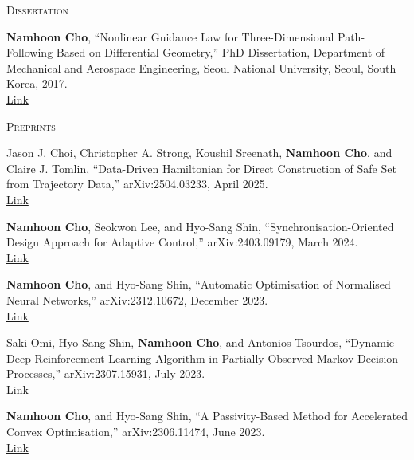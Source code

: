 \textsc{Dissertation}
\vspace{0.5em}
\begin{enumerate}[label={[}\arabic*{]}]
\item \textbf{Namhoon Cho}, ``Nonlinear Guidance Law for Three-Dimensional Path-Following Based on Differential Geometry,'' PhD Dissertation, Department of Mechanical and Aerospace Engineering, Seoul National University, Seoul, South Korea, 2017. \\
\href{https://hdl.handle.net/10371/118598}{Link}

\end{enumerate}
\vspace{0.5em}

\textsc{Preprints}
\vspace{0.5em}
\begin{enumerate}[itemsep=0.5em, label={[}PP\arabic*{]}]
\item Jason J. Choi, Christopher A. Strong, Koushil Sreenath, \textbf{Namhoon Cho}, and Claire J. Tomlin, ``Data-Driven Hamiltonian for Direct Construction of Safe Set from Trajectory Data,'' arXiv:2504.03233, April 2025. \\
\href{https://arxiv.org/abs/2504.03233}{Link}

\item \textbf{Namhoon Cho}, Seokwon Lee, and Hyo-Sang Shin, ``Synchronisation-Oriented Design Approach for Adaptive Control,'' arXiv:2403.09179, March 2024. \\
\href{https://arxiv.org/abs/2403.09179}{Link}

\item \textbf{Namhoon Cho}, and Hyo-Sang Shin, ``Automatic Optimisation of Normalised Neural Networks,'' arXiv:2312.10672, December 2023. \\
\href{https://arxiv.org/abs/2312.10672}{Link}

\item Saki Omi, Hyo-Sang Shin, \textbf{Namhoon Cho}, and Antonios Tsourdos, ``Dynamic Deep-Reinforcement-Learning Algorithm in Partially Observed Markov Decision Processes,'' arXiv:2307.15931, July 2023. \\
\href{https://arxiv.org/abs/2307.15931}{Link}

\item \textbf{Namhoon Cho}, and Hyo-Sang Shin, ``A Passivity-Based Method for Accelerated Convex Optimisation,'' arXiv:2306.11474, June 2023. \\
\href{https://arxiv.org/abs/2306.11474}{Link}


\end{enumerate}
